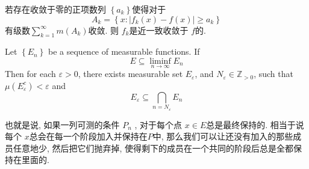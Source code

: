 \documentclass[../main.tex]{subfiles}
\begin{document}
\begin{corollary}{}{}
     若存在收敛于零的正项数列 \(  \left\{ a_{k} \right\}  \)使得对于 \[
  A_{k}= \left\{ x: \left| f_{k}\left( x \right)-f\left( x \right)   \right|\ge a_{k}  \right\}
  \]有级数\(  \sum _{k= 1}^{\infty}m\left( A_{k} \right)   \)收敛.  则 \(  f_{k}  \)是近一致收敛于 \(  f  \)的.  
\end{corollary}

\begin{corollary}{}{}
    Let \(  \left\{ E_{n} \right\}  \) be a sequence of  measurable functions. If \[
    E\subseteq \liminf_{n\to \infty}E_{n}
    \] Then for each \(   \varepsilon > 0  \), there exists measurable set \(  E_{ \varepsilon }  \), and \(  N_{ \varepsilon }\in \mathbb{Z} _{> 0}  \), such that \(  \mu \left( E_{ \varepsilon }^{c} \right)<  \varepsilon    \) and \[
    E_{ \varepsilon }\subseteq \bigcap _{n = N_{ \varepsilon }}E_{n}
    \]   
\end{corollary}

\begin{remark}
    也就是说, 如果一列可测的条件 \(  P_{n}  \) , 对于每个点 \(  x \in E  \)总是最终保持的. 相当于说每个 \(  x  \)总会在每一个阶段加入并保持在\(  P  \)中, 那么我们可以让还没有加入的那些成员任意地少, 然后把它们抛弃掉, 使得剩下的成员在一个共同的阶段后总是全都保持在里面的.   
\end{remark}
\end{document}

